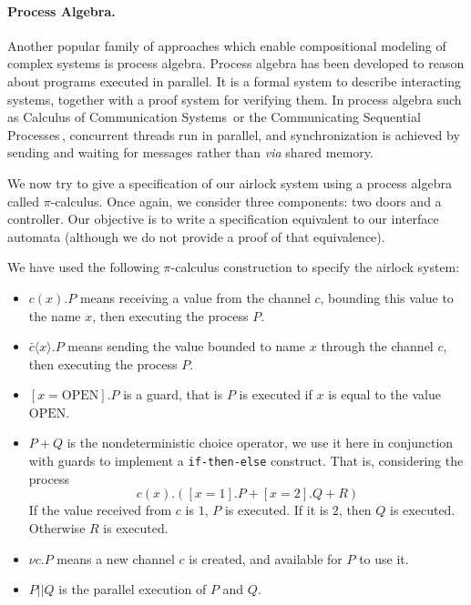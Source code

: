 \paragraph{Process Algebra.}
%
Another popular family of approaches which enable compositional modeling of
complex systems is process algebra.
%
Process algebra has been developed to reason about programs executed in
parallel.
%
It is a formal system to describe interacting systems, together with a proof
system for verifying them.
%
In process algebra such as Calculus of Communication
Systems\,\cite{milner1980ccs} or the Communicating Sequential
Processes\,\cite{hoare1978csp}, concurrent threads run in parallel, and
synchronization is achieved by sending and waiting for messages rather than
\emph{via} shared memory.

\begin{example}
  \label{example:sota:airlockprocess}

  We now try to give a specification of our airlock system using a process
  algebra called \( \pi \)-calculus.
  Once again, we consider three components: two doors and a controller.
  Our objective is to write a specification equivalent to our interface automata
  (although we do not provide a proof of that equivalence).

  We have used the following \( \pi \)-calculus construction to specify the
  airlock system:
  \begin{itemize}
  \item \( c(x). P\) means receiving a value from the channel \( c \), bounding
    this value to the name \( x \), then executing the process \( P \).
  \item \( \bar{c} \langle x \rangle . P \) means sending the value bounded to
    name \( x \) through the channel \( c \), then executing the process
    \( P \).
  \item \( [x = \mathrm{OPEN}] . P \) is a guard, that is \( P \) is executed if
    \( x \) is equal to the value \( \mathrm{OPEN} \).
  \item \( P + Q \) is the nondeterministic choice operator, we use it here in
    conjunction with guards to implement a \texttt{if-then-else} construct. That
    is, considering the process
    \[
      c(x) . ([x = 1] . P + [x = 2] . Q + R)
    \]
    If the value received from \( c \) is \( 1 \), \( P \) is executed.
    If it is \( 2 \), then \( Q \) is executed. Otherwise \( R \) is executed.
  \item \( \nu c. P \) means a new channel \( c \) is created, and available for
    \( P \) to use it.
  \item \( P || Q \) is the parallel execution of \( P \) and \( Q \).
  \end{itemize}


\end{example}
